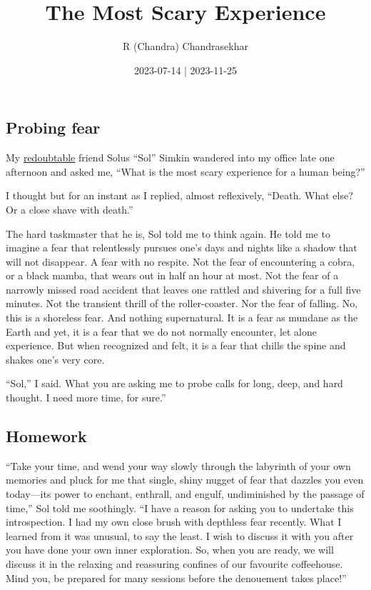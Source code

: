 \documentclass[
  a4paper,
]{article}
\title{The Most Scary Experience}
\author{R (Chandra) Chandrasekhar}
\date{2023-07-14 | 2023-11-25}
\begin{document}
\maketitle

\thispagestyle{empty}


\hypertarget{probing-fear}{%
\subsection{Probing fear}\label{probing-fear}}

My \href{https://www.thefreedictionary.com/redoubtable}{redoubtable}
friend Solus ``Sol'' Simkin wandered into my office late one afternoon
and asked me, ``What is the most scary experience for a human being?''

I thought but for an instant as I replied, almost reflexively, ``Death.
What else? Or a close shave with death.''

The hard taskmaster that he is, Sol told me to think again. He told me
to imagine a fear that relentlessly pursues one's days and nights like a
shadow that will not disappear. A fear with no respite. Not the fear of
encountering a cobra, or a black mamba, that wears out in half an hour
at most. Not the fear of a narrowly missed road accident that leaves one
rattled and shivering for a full five minutes. Not the transient thrill
of the roller-coaster. Nor the fear of falling. No, this is a shoreless
fear. And nothing supernatural. It is a fear as mundane as the Earth and
yet, it is a fear that we do not normally encounter, let alone
experience. But when recognized and felt, it is a fear that chills the
spine and shakes one's very core.

``Sol,'' I said. What you are asking me to probe calls for long, deep,
and hard thought. I need more time, for sure.''

\hypertarget{homework}{%
\subsection{Homework}\label{homework}}

``Take your time, and wend your way slowly through the labyrinth of your
own memories and pluck for me that single, shiny nugget of fear that
dazzles you even today---its power to enchant, enthrall, and engulf,
undiminished by the passage of time,'' Sol told me soothingly. ``I have
a reason for asking you to undertake this introspection. I had my own
close brush with depthless fear recently. What I learned from it was
unusual, to say the least. I wish to discuss it with you after you have
done your own inner exploration. So, when you are ready, we will discuss
it in the relaxing and reassuring confines of our favourite coffeehouse.
Mind you, be prepared for many sessions before the denouement takes
place!''
\end{document}
